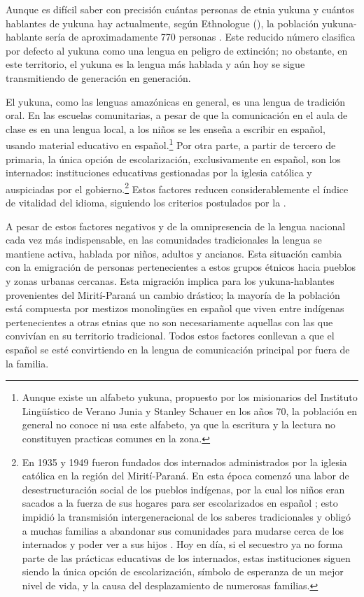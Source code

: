 \documentclass[output=paper]{langscibook}
\begin{document}
Aunque es difícil saber con precisión cuántas personas de etnia yukuna y cuántos hablantes de yukuna hay actualmente, según Ethnologue (\citealt{EberhardEtAl2020}), la población yukuna-hablante sería de aproximadamente 770 personas \citep{Crevels2012}. Este reducido número clasifica por defecto al yukuna como una lengua en peligro de extinción; no obstante, en este territorio, el yukuna es la lengua más hablada \citep{Eraso2015} y aún hoy se sigue transmitiendo de generación en generación.

El yukuna, como las lenguas amazónicas en general, es una lengua de tradición oral. En las escuelas comunitarias, a pesar de que la comunicación en el aula de clase es en una lengua local, a los niños se les enseña a escribir en español, usando material educativo en español.\footnote{Aunque existe un alfabeto yukuna, propuesto por los misionarios del Instituto Lingüístico de Verano Junia y Stanley Schauer en los años 70, la población en general no conoce ni usa este alfabeto, ya que la escritura y la lectura no constituyen practicas comunes en la zona.} Por otra parte, a partir de tercero de primaria, la única opción de escolarización, exclusivamente en español, son los internados: instituciones educativas gestionadas por la iglesia católica y auspiciadas por el gobierno.\footnote{En 1935 y 1949 fueron fundados dos internados administrados por la iglesia católica en la región del Mirití-Paraná. En esta época comenzó una labor de desestructuración social de los pueblos indígenas, por la cual los niños eran sacados a la fuerza de sus hogares para ser escolarizados en español \citep{Eraso2015}; esto impidió la transmisión intergeneracional de los saberes tradicionales y obligó a muchas familias a abandonar sus comunidades para mudarse cerca de los internados y poder ver a sus hijos \citep{Fontaine2001}. Hoy en día, si el secuestro ya no forma parte de las prácticas educativas de los internados, estas instituciones siguen siendo la única opción de escolarización, símbolo de esperanza de un mejor nivel de vida, y la causa del desplazamiento de numerosas familias.} Estos factores reducen considerablemente el índice de vitalidad del idioma, siguiendo los criterios postulados por la \citet{UNESCO2003}.

A pesar de estos factores negativos y de la omnipresencia de la lengua nacional cada vez más indispensable, en las comunidades tradicionales la lengua se mantiene activa, hablada por niños, adultos y ancianos. Esta situación cambia con la emigración de personas pertenecientes a estos grupos étnicos hacia pueblos y zonas urbanas cercanas. Esta migración implica para los yukuna-hablantes provenientes del Mirití-Paraná un cambio drástico; la mayoría de la población está compuesta por mestizos monolingües en español que viven entre indígenas pertenecientes a otras etnias que no son necesariamente aquellas con las que convivían en su territorio tradicional. Todos estos factores conllevan a que el español se esté convirtiendo en la lengua de comunicación principal por fuera de la familia. 
\end{document}
